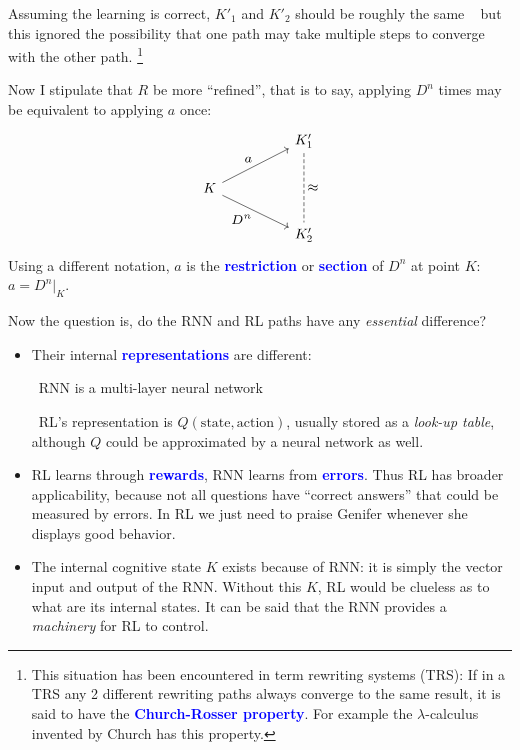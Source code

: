\documentclass[orivec]{llncs}
\newcommand{\emp}[1]{\textbf{\textcolor{blue}{#1}}}
\newcommand{\dashh}{\textemdash~}
\begin{document}
Assuming the learning is correct, $K'_1$ and $K'_2$ should be roughly the same \textemdash~ but this ignored the possibility that one path may take multiple steps to converge with the other path.  \footnote{This situation has been encountered in term rewriting systems (TRS):  If in a TRS any 2 different rewriting paths always converge to the same result, it is said to have the \emp{Church-Rosser property}.  For example the $\lambda$-calculus invented by Church has this property.} 

Now I stipulate that $R$ be more ``refined'', that is to say, applying $D^n$ times may be equivalent to applying $a$ once:
\begin{equation}
\begin{tikzcd}[column sep=huge]
& K'_1 \arrow[dd, dashed, no head, "\scalebox{1.3}{$\approx$}"] \\
K \arrow[ur, "\scalebox{1.3}{$a$}"] \arrow[dr, "{\scalebox{1.3}{$D^n$}}"'] & \\
& K'_2
\end{tikzcd}
\end{equation}
Using a different notation, $a$ is the \emp{restriction} or \emp{section} of $D^n$ at point $K$: $a = D^n|_K$.

Now the question is, do the RNN and RL paths have any \textit{essential} difference?
\begin{itemize}
\item Their internal \emp{representations} are different:\par
\dashh RNN is a multi-layer neural network\par
\dashh RL's representation is $Q(\mbox{state},\mbox{action})$, usually stored as a \textit{look-up table}, although $Q$ could be approximated by a neural network as well.
\item RL learns through \emp{rewards}, RNN learns from \emp{errors}.  Thus RL has broader applicability, because not all questions have ``correct answers'' that could be measured by errors.  In RL we just need to praise Genifer whenever she displays good behavior.
\item The internal cognitive state $K$ exists because of RNN:  it is simply the vector input and output of the RNN.  Without this $K$, RL would be clueless as to what are its internal states.  It can be said that the RNN provides a \textit{machinery} for RL to control.
\end{itemize}

\end{document}
